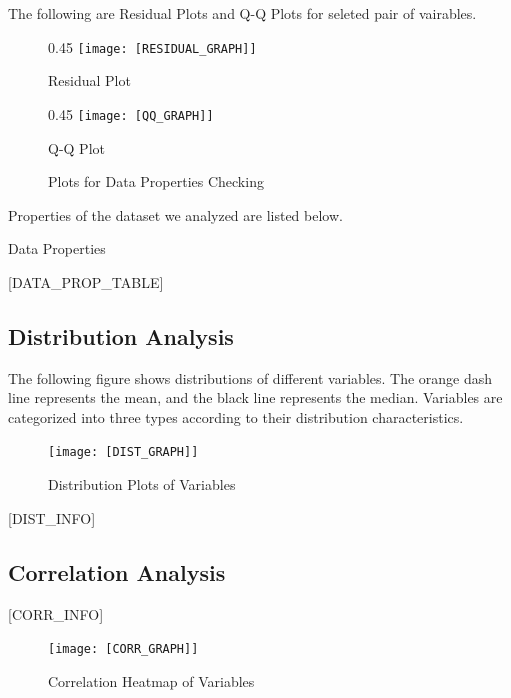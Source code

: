 \documentclass{article}
\begin{document}
The following are Residual Plots and Q-Q Plots for seleted pair of vairables.

\begin{figure}[H]
    \centering
    \begin{{subfigure}}{{0.45\textwidth}}
        \centering
        \texttt{[image: [RESIDUAL\_GRAPH]]}
        \vfill
        \caption{Residual Plot}
    \end{{subfigure}}
    \begin{{subfigure}}{{0.45\textwidth}}
        \centering
        \texttt{[image: [QQ\_GRAPH]]}
        \vfill
        \caption{Q-Q Plot}
    \end{{subfigure}}
\caption{Plots for Data Properties Checking}
\end{figure}   


Properties of the dataset we analyzed are listed below.

\begin{table}[H]
    \centering
    \caption{Data Properties}
[DATA_PROP_TABLE]
\end{table}


\subsection{Distribution Analysis}
The following figure shows distributions of different variables. The orange dash line represents the mean, 
and the black line represents the median. Variables are categorized into three types according to their distribution characteristics.

\begin{figure}[H]
\centering
\texttt{[image: [DIST\_GRAPH]]}
\caption{\label{fig:dist}Distribution Plots of Variables}
\end{figure}

[DIST_INFO]

\subsection{Correlation Analysis}

\begin{minipage}[t]{0.5\linewidth}
    [CORR_INFO]
\vfill
\end{minipage}
\hfill
\begin{minipage}[t]{0.5\linewidth}
    \begin{figure}[H]
        \centering
        \vspace{-1.5cm}
        \texttt{[image: [CORR\_GRAPH]]}
        \caption{\label{fig:corr}Correlation Heatmap of Variables}
    \end{figure}
\end{minipage}
\end{document}
